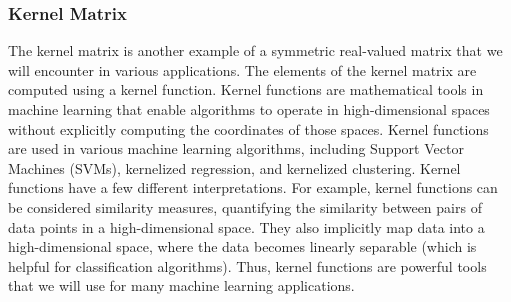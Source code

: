 \documentclass{article}[11pt]
\begin{document}
\subsubsection*{Kernel Matrix}
The kernel matrix is another example of a symmetric real-valued matrix that we will encounter in various applications.
The elements of the kernel matrix are computed using a kernel function.
Kernel functions are mathematical tools in machine learning that enable algorithms to operate in high-dimensional spaces without explicitly computing the coordinates of those spaces.
Kernel functions are used in various machine learning algorithms, including Support Vector Machines (SVMs), kernelized regression, and kernelized clustering.
Kernel functions have a few different interpretations. 
For example, kernel functions can be considered similarity measures, quantifying the similarity between pairs of data points in a high-dimensional space.
They also implicitly map data into a high-dimensional space, where the data becomes linearly separable (which is helpful for classification algorithms).
Thus, kernel functions are powerful tools that we will use for many machine learning applications.
\end{document}
